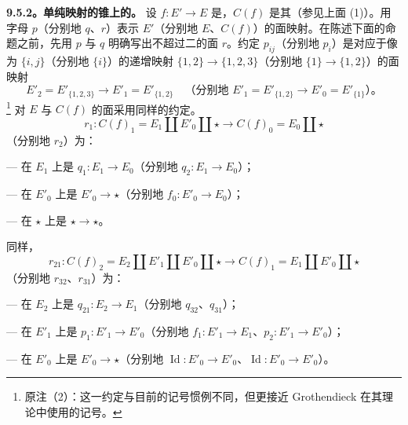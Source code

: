 \textbf{9.5.2。单纯映射的锥上的。}
设 $f:E'\to E$ 是，$C(f)$ 是其（参见上面 (1)）。用字母 $p$（分别地 $q$、$r$）表示 $E'$（分别地 $E$、$C(f)$）的面映射。在陈述下面的命题之前，先用 $p$ 与 $q$ 明确写出不超过二的面 $r$。约定 $p_{ij}$（分别地 $p_i$）是对应于像为 $\{i,j\}$（分别地 $\{i\}$）的递增映射 $\{1,2\}\to\{1,2,3\}$（分别地 $\{1\}\to\{1,2\}$）的面映射
\[
E'_2=E'_{\{1,2,3\}}\longrightarrow E'_1=E'_{\{1,2\}}
\quad\text{（分别地 }E'_1=E'_{\{1,2\}}\longrightarrow E'_0=E'_{\{1\}}\text{）。}
\]
\footnote{原注（2）：这一约定与目前的记号惯例不同，但更接近 Grothendieck 在其理论中使用的记号。} 对 $E$ 与 $C(f)$ 的面采用同样的约定。
\[
r_1:C(f)_1=E_1\amalg E'_0\amalg\star\longrightarrow C(f)_0=E_0\amalg\star
\]
（分别地 $r_2$）为：

— 在 $E_1$ 上是 $q_1:E_1\to E_0$（分别地 $q_2:E_1\to E_0$）；

— 在 $E'_0$ 上是 $E'_0\to\star$（分别地 $f_0:E'_0\to E_0$）；

— 在 $\star$ 上是 $\star\to\star$。

同样，
\[
r_{21}:C(f)_2=E_2\amalg E'_1\amalg E'_0\amalg\star
\longrightarrow C(f)_1=E_1\amalg E'_0\amalg\star
\]
（分别地 $r_{32}$、$r_{31}$）为：

— 在 $E_2$ 上是 $q_{21}:E_2\to E_1$（分别地 $q_{32}$、$q_{31}$）；

— 在 $E'_1$ 上是 $p_1:E'_1\to E'_0$（分别地 $f_1:E'_1\to E_1$、$p_2:E'_1\to E'_0$）；

— 在 $E'_0$ 上是 $E'_0\to\star$（分别地 $\operatorname{Id}:E'_0\to E'_0$、$\operatorname{Id}:E'_0\to E'_0$）。


